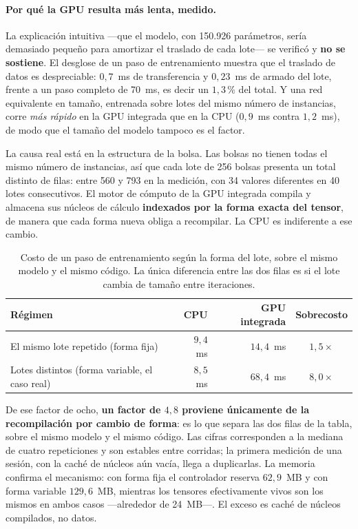 \documentclass[11pt,a4paper]{article}
\begin{document}
\begin{bloquenuevo}
\paragraph{Por qué la GPU resulta más lenta, medido.} La explicación intuitiva ---que el modelo,
con 150.926 parámetros, sería demasiado pequeño para amortizar el traslado de cada lote--- se
verificó y \textbf{no se sostiene}. El desglose de un paso de entrenamiento muestra que el
traslado de datos es despreciable: $0{,}7$~ms de transferencia y $0{,}23$~ms de armado del lote,
frente a un paso completo de 70~ms, es decir un $1{,}3$\,\% del total. Y una red equivalente en
tamaño, entrenada sobre lotes del mismo número de instancias, corre \emph{más rápido} en la GPU
integrada que en la CPU ($0{,}9$~ms contra $1{,}2$~ms), de modo que el tamaño del modelo tampoco
es el factor.

La causa real está en la estructura de la bolsa. Las bolsas no tienen todas el mismo número de
instancias, así que cada lote de 256 bolsas presenta un total distinto de filas: entre 560 y 793
en la medición, con 34 valores diferentes en 40 lotes consecutivos. El motor de cómputo de la
GPU integrada compila y almacena sus núcleos de cálculo \textbf{indexados por la forma exacta del
tensor}, de manera que cada forma nueva obliga a recompilar. La CPU es indiferente a ese cambio.

\begin{table}[H]
\centering
\caption{Costo de un paso de entrenamiento según la forma del lote, sobre el mismo modelo y el
mismo código. La única diferencia entre las dos filas es si el lote cambia de tamaño entre
iteraciones.}
\label{tab:formalote}
\small
\begin{tabularx}{\textwidth}{X r r c}
\toprule
\textbf{Régimen} & \textbf{CPU} & \textbf{GPU integrada} & \textbf{Sobrecosto} \\
\midrule
El mismo lote repetido (forma fija)      & $9{,}4$~ms & $14{,}4$~ms & $1{,}5\times$ \\
Lotes distintos (forma variable, el caso real) & $8{,}5$~ms & $68{,}4$~ms & $8{,}0\times$ \\
\bottomrule
\end{tabularx}
\end{table}

De ese factor de ocho, \textbf{un factor de $4{,}8$ proviene únicamente de la recompilación por
cambio de forma}: es lo que separa las dos filas de la tabla, sobre el mismo modelo y el mismo
código. Las cifras corresponden a la mediana de cuatro repeticiones y son estables entre
corridas; la primera medición de una sesión, con la caché de núcleos aún vacía, llega a
duplicarlas. La memoria confirma el mecanismo: con forma fija el controlador reserva
$62{,}9$~MB y con forma variable $129{,}6$~MB, mientras los tensores efectivamente vivos son los
mismos en ambos casos ---alrededor de 24~MB---. El exceso es caché de núcleos compilados, no
datos.


\end{bloquenuevo}
\end{document}
